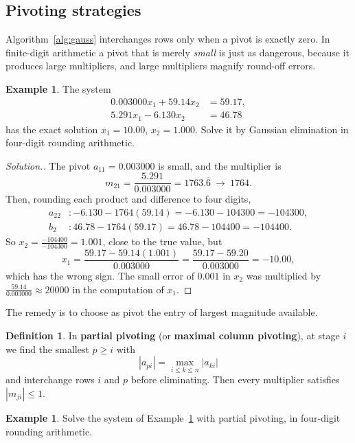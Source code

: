 \documentclass[11pt,a4paper]{article}
\numberwithin{equation}{section}
\theoremstyle{definition}
\newtheorem{defn}[thm]{Definition}
\newtheorem{exa}[thm]{Example}
\newenvironment{solution}
  {\renewcommand{\qedsymbol}{}\begin{proof}[\textit{Solution}.]}
  {\end{proof}}
\begin{document}
\subsection{Pivoting strategies}
\label{sec:pivoting}

Algorithm~\ref{alg:gauss} interchanges rows only when a pivot is exactly zero. In finite-digit arithmetic a pivot that is merely
\emph{small} is just as dangerous, because it produces large multipliers, and large multipliers magnify round-off errors.

\begin{exa}
\label{exa:smallpivot}
The system
\begin{align*}
0.003000x_1+59.14x_2 &= 59.17,\\
5.291x_1-6.130x_2 &= 46.78
\end{align*}
has the exact solution $x_1 = 10.00$, $x_2 = 1.000$. Solve it by Gaussian elimination in four-digit rounding arithmetic.
\end{exa}

\begin{solution}
The pivot $a_{11} = 0.003000$ is small, and the multiplier is
$$m_{21} = \frac{5.291}{0.003000} = 1763.\overline{6}\ \to\ 1764 .$$
Then, rounding each product and difference to four digits,
\begin{align*}
a_{22}&: -6.130-1764(59.14) = -6.130-104300 = -104300,\\
b_2&: 46.78-1764(59.17) = 46.78-104400 = -104400 .
\end{align*}
So $x_2 = \frac{-104400}{-104300} = 1.001$, close to the true value, but
$$x_1 = \frac{59.17-59.14(1.001)}{0.003000} = \frac{59.17-59.20}{0.003000} = -10.00 ,$$
which has the wrong sign. The small error of $0.001$ in $x_2$ was multiplied by $\frac{59.14}{0.003000}\approx20000$ in the
computation of $x_1$.
\end{solution}

The remedy is to choose as pivot the entry of largest magnitude available.

\begin{defn}
In \textbf{partial pivoting} (or \textbf{maximal column pivoting}), at stage $i$ we find the smallest $p\geq i$ with
$$|a_{pi}| = \max_{i\leq k\leq n}|a_{ki}|$$
and interchange rows $i$ and $p$ before eliminating. Then every multiplier satisfies $|m_{ji}|\leq1$.
\end{defn}

\begin{exa}
Solve the system of Example~\ref{exa:smallpivot} with partial pivoting, in four-digit rounding arithmetic.
\end{exa}
\end{document}
